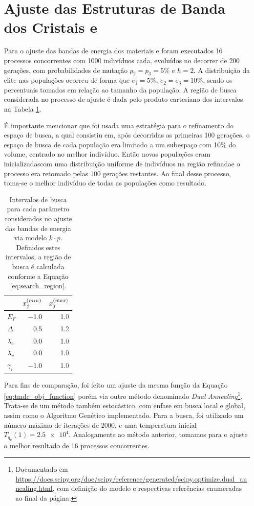 \section{Ajuste das Estruturas de Banda dos Cristais  e }
\label{sec_resultados_tmdcs}

Para o ajuste das bandas de energia dos materiais  e  foram
executados 16 processos concorrentes com 1000 indivíduos cada, evoluídos no
decorrer de 200 gerações, com probabilidades de mutação $ p_2 = p_3 = 5\% $ e
$ h = 2 $. A distribuição da elite nas populações ocorreu de forma que $ e_1 =
  5\% $, $ e_2 = e_3 = 10\% $, sendo os percentuais tomados em relação ao tamanho
da população. A região de busca considerada no processo de ajuste é dada pelo
produto cartesiano dos intervalos na Tabela \ref{tab:search_region}.

É importante mencionar que foi usada uma estratégia para o refinamento do espaço
de busca, a qual consistiu em, após decorridas as primeiras 100 gerações, o
espaço de busca de cada população era limitado a um subespaço com 10\% do
volume, centrado no melhor indivíduo. Então novas populações eram
inicializadas\trav com uma distribuição uniforme de indivíduos na região
refinada\trav e o processo era retomado pelas 100 gerações restantes.
Ao final desse processo, toma-se o melhor indivíduo de todas as populações
como resultado.

\begin{table}[h]
  \centering
  \begin{tabular}{lrr}
    \toprule
                & $x^{(min)}_{j}$ & $x^{(max)}_{j}$ \\
    \midrule
    $E_F$       & \num{-1.0} & \num{1.0}  \\
    $\Delta$    & \num{0.5}  & \num{1.2}  \\
    $\lambda_c$ & \num{0.0}  & \num{1.0}  \\
    $\lambda_v$ & \num{0.0}  & \num{1.0}  \\
    $\gamma_i$  & \num{-1.0} & \num{1.0}  \\
    \bottomrule
  \end{tabular}
  \caption{
    Intervalos de busca para cada parâmetro considerados no ajuste das bandas de
    energia via modelo $ k \cdot p $. Definidos estes intervalos, a região de
    busca é calculada conforme a Equação \ref{eq:search_region}.
  }
  \label{tab:search_region}
\end{table}

Para fins de comparação, foi feito um ajuste da mesma função da Equação
\ref{eq:tmdc_obj_function} porém via outro método denominado
\textit{Dual Annealing}\footnote{
  Documentado em 
  \url{https://docs.scipy.org/doc/scipy/reference/generated/scipy.optimize.dual_annealing.html},
  com definição do modelo e respectivas referências enumeradas ao final da página.
}. Trata-se de um método também estocástico, com enfase em busca local e global,
assim como o Algoritmo Genético implementado. Para a busca, foi utilizado um
número máximo de iterações de 2000, e uma temperatura inicial 
$ T_{q_v}(1) = \num{2.5e4} $. Analogamente ao método anterior, tomamos para o
ajuste o melhor resultado de 16 processos concorrentes.

